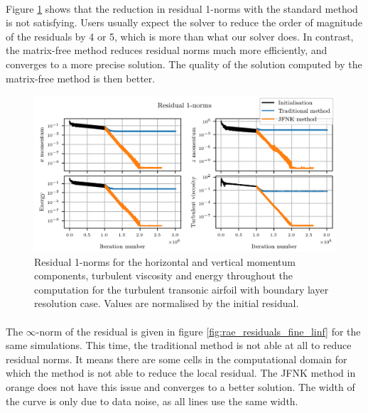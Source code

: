         \paragraph{}
        Figure \ref{fig:rae_residuals_fine_l1} shows that the reduction in residual 1-norms with the standard method is not satisfying.
        Users usually expect the solver to reduce the order of magnitude of the residuals by 4 or 5, which is more than what our solver does.
        In contrast, the matrix-free method reduces residual norms much more efficiently, and converges to a more precise solution.
        The quality of the solution computed by the matrix-free method is then better.

        \begin{figure}
          \centering
          \includegraphics{figures/rae_residuals_fine_l1.png}
          \caption{Residual 1-norms for the horizontal and vertical momentum components, turbulent viscosity and energy throughout the computation for the turbulent transonic airfoil with boundary layer resolution case.
          Values are normalised by the initial residual.}
          \label{fig:rae_residuals_fine_l1}
        \end{figure}

        \paragraph{}
        The $\infty$-norm of the residual is given in figure \ref{fig:rae_residuals_fine_linf} for the same simulations.
        This time, the traditional method is not able at all to reduce residual norms.
        It means there are some cells in the computational domain for which the method is not able to reduce the local residual.
        The JFNK method in orange does not have this issue and converges to a better solution.
        The width of the curve is only due to data noise, as all lines use the same width.

